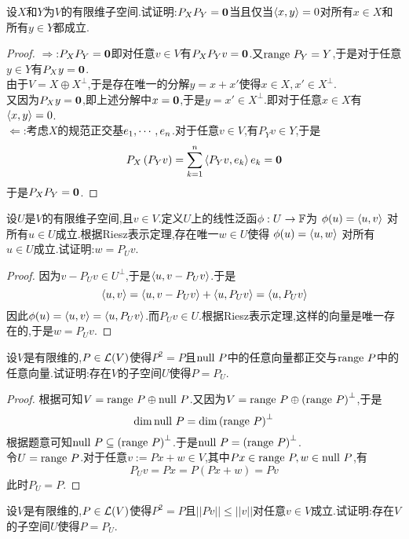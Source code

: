 \documentclass{ctexart}
\begin{document}
\begin{problem}[7.]
    设$X$和$Y$为$V$的有限维子空间.试证明:$P_XP_Y=\mathbf0$当且仅当$\left\langle{x},{y}\right\rangle=0$对所有$x\in X$和所有$y\in Y$都成立.
\end{problem}
\begin{proof}
    $\Rightarrow$:$P_XP_Y=\mathbf0$即对任意$v\in V$有$P_XP_Yv=\mathbf0$.又$\text{range } P_Y=Y$,于是对于任意$y\in Y$有$P_Xy=\mathbf0$.\\
    由于$V=X\oplus X^\bot$,于是存在唯一的分解$y=x+x'$使得$x\in X,x'\in X^\bot$.\\
    又因为$P_Xy=\mathbf0$,即上述分解中$x=\mathbf0$,于是$y=x'\in X^\bot$.即对于任意$x\in X$有$\left\langle{x},{y}\right\rangle=0$.\\
    $\Leftarrow$:考虑$X$的规范正交基${e}_1,\cdots,{e}_{n}$.对于任意$v\in V$,有$P_Yv\in Y$,于是
    \[P_X\left(P_Yv\right)=\sum_{k=1}^{n}\left\langle{P_Yv},{e_k}\right\rangle e_k=\mathbf0\]
    于是$P_XP_Y=\mathbf0$.
\end{proof}
\begin{problem}[8.]
    设$U$是$V$的有限维子空间,且$v\in V$.定义$U$上的线性泛函$\phi:U\to\mathbb{F}$为
    \(\phi(u)=\left\langle{u},{v}\right\rangle\)
    对所有$u\in U$成立.根据Riesz表示定理,存在唯一$w\in U$使得
    \(\phi(u)=\left\langle{u},{w}\right\rangle\)
    对所有$u\in U$成立.试证明:$w=P_Uv$.
\end{problem}
\begin{proof}
    因为$v-P_Uv\in U^\bot$,于是$\left\langle{u},{v-P_Uv}\right\rangle$.于是
    \[\left\langle{u},{v}\right\rangle=\left\langle{u},{v-P_Uv}\right\rangle+\left\langle{u},{P_Uv}\right\rangle=\left\langle{u},{P_Uv}\right\rangle\]
    因此$\phi(u)=\left\langle{u},{v}\right\rangle=\left\langle{u},{P_Uv}\right\rangle$.而$P_Uv\in U$.根据Riesz表示定理,这样的向量是唯一存在的,于是$w=P_Uv$.
\end{proof}
\begin{problem}[9.]
    设$V$是有限维的,$P\in\mathcal{L}(V)$使得$P^2=P$且$\text{null } P$中的任意向量都正交与$\text{range } P$中的任意向量.试证明:存在$V$的子空间$U$使得$P=P_U$.
\end{problem}
\begin{proof}
    根据可知$V=\text{range } P\oplus\text{null } P$.又因为$V=\text{range } P\oplus\left(\text{range } P\right)^\bot$,于是
    \[\dim\text{null } P=\dim\left(\text{range } P\right)^\bot\]
    根据题意可知$\text{null } P\subseteq\left(\text{range } P\right)^{\bot}$.于是$\text{null } P=\left(\text{range } P\right)^\bot$.\\
    令$U=\text{range } P$.对于任意$v:=Px+w\in V$,其中$Px\in\text{range } P,w\in\text{null } P$,有
    \[P_Uv=Px=P\left(Px+w\right)=Pv\]
    此时$P_U=P$.
\end{proof}
\begin{problem}[10.]
    设$V$是有限维的,$P\in\mathcal{L}(V)$使得$P^2=P$且$||Pv||\leqslant||v||$对任意$v\in V$成立.试证明:存在$V$的子空间$U$使得$P=P_U$.
\end{problem}
\end{document}
